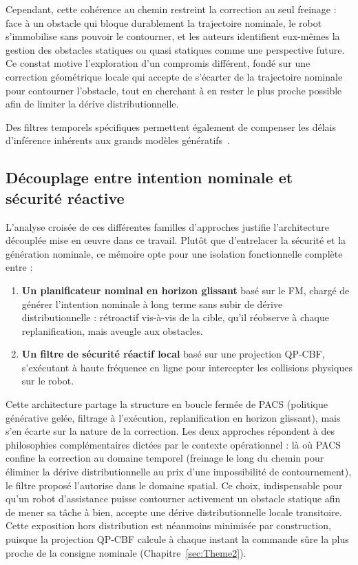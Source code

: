 Cependant, cette cohérence au chemin restreint la correction au seul freinage : face à un obstacle qui bloque durablement la trajectoire nominale, le robot s'immobilise sans pouvoir le contourner, et les auteurs identifient eux-mêmes la gestion des obstacles statiques ou quasi statiques comme une perspective future. Ce constat motive l'exploration d'un compromis différent, fondé sur une correction géométrique locale qui accepte de s'écarter de la trajectoire nominale pour contourner l'obstacle, tout en cherchant à en rester le plus proche possible afin de limiter la dérive distributionnelle.

Des filtres temporels spécifiques permettent également de compenser les délais d'inférence inhérents aux grands modèles génératifs~\cite{Liao2025Delay,Ye2025Rapid}.

\subsection{Découplage entre intention nominale et sécurité réactive}
L'analyse croisée de ces différentes familles d'approches justifie l'architecture découplée mise en œuvre dans ce travail. Plutôt que d'entrelacer la sécurité et la génération nominale, ce mémoire opte pour une isolation fonctionnelle complète entre :
\begin{enumerate}
\item \textbf{Un planificateur nominal en horizon glissant} basé sur le \ac{FM}, chargé de générer l'intention nominale à long terme sans subir de dérive distributionnelle : rétroactif vis-à-vis de la cible, qu'il réobserve à chaque replanification, mais aveugle aux obstacles.
\item \textbf{Un filtre de sécurité réactif local} basé sur une projection \ac{QP}-\ac{CBF}, s'exécutant à haute fréquence en ligne pour intercepter les collisions physiques sur le robot.
\end{enumerate}

Cette architecture partage la structure en boucle fermée de \ac{PACS} (politique générative gelée, filtrage à l'exécution, replanification en horizon glissant), mais s'en écarte sur la nature de la correction. Les deux approches répondent à des philosophies complémentaires dictées par le contexte opérationnel : là où \ac{PACS} confine la correction au domaine temporel (freinage le long du chemin pour éliminer la dérive distributionnelle au prix d'une impossibilité de contournement), le filtre proposé l'autorise dans le domaine spatial. Ce choix, indispensable pour qu'un robot d'assistance puisse contourner activement un obstacle statique afin de mener sa tâche à bien, accepte une dérive distributionnelle locale transitoire. Cette exposition hors distribution est néanmoins minimisée par construction, puisque la projection \ac{QP}-\ac{CBF} calcule à chaque instant la commande sûre la plus proche de la consigne nominale (Chapitre~\ref{sec:Theme2}).

